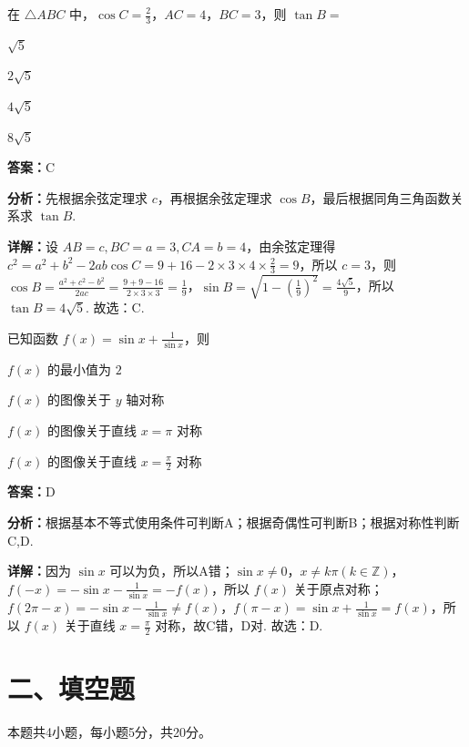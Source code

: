 \begin{question}[points=5]
在 $\triangle ABC$ 中，$\cos C=\frac{2}{3}$，$AC=4$，$BC=3$，则 $\tan B=$
\begin{choices}
  \item $\sqrt{5}$
  \item $2\sqrt{5}$
  \item $4\sqrt{5}$
  \item $8\sqrt{5}$
\end{choices}
\begin{solution}
\textbf{答案：}C

\textbf{分析：}先根据余弦定理求 $c$，再根据余弦定理求 $\cos B$，最后根据同角三角函数关系求 $\tan B$.

\textbf{详解：}设 $AB=c, BC=a=3, CA=b=4$，由余弦定理得 $c^2=a^2+b^2-2ab\cos C=9+16-2\times3\times4\times\frac{2}{3}=9$，所以 $c=3$，则 $\cos B=\frac{a^2+c^2-b^2}{2ac}=\frac{9+9-16}{2\times3\times3}=\frac{1}{9}$，$\sin B=\sqrt{1-(\frac{1}{9})^2}=\frac{4\sqrt{5}}{9}$，所以 $\tan B=4\sqrt{5}$. 故选：C.
\end{solution}
\end{question}

\begin{question}[points=5]
已知函数 $f(x)=\sin x+\frac{1}{\sin x}$，则
\begin{choices}
  \item $f(x)$ 的最小值为 $2$
  \item $f(x)$ 的图像关于 $y$ 轴对称
  \item $f(x)$ 的图像关于直线 $x=\pi$ 对称
  \item $f(x)$ 的图像关于直线 $x=\frac{\pi}{2}$ 对称
\end{choices}
\begin{solution}
\textbf{答案：}D

\textbf{分析：}根据基本不等式使用条件可判断A；根据奇偶性可判断B；根据对称性判断C,D.

\textbf{详解：}因为 $\sin x$ 可以为负，所以A错；$\sin x\neq0$，$x\neq k\pi(k\in\mathbb Z)$，$f(-x)=-\sin x-\frac{1}{\sin x}=-f(x)$，所以 $f(x)$ 关于原点对称；$f(2\pi-x)=-\sin x-\frac{1}{\sin x}\neq f(x)$，$f(\pi-x)=\sin x+\frac{1}{\sin x}=f(x)$，所以 $f(x)$ 关于直线 $x=\frac{\pi}{2}$ 对称，故C错，D对. 故选：D.
\end{solution}
\end{question}

\section*{二、填空题}
本题共4小题，每小题5分，共20分。

